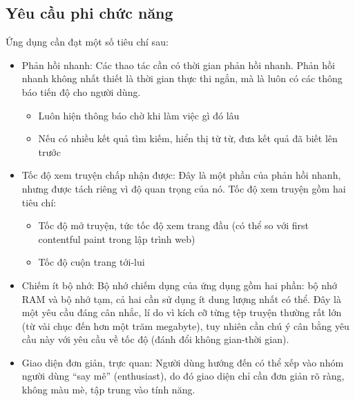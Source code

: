 \documentclass[../../thesis]{subfiles}
\begin{document}
\subsection{Yêu cầu phi chức năng}\label{sec:non-functional-requirements}

Ứng dụng cần đạt một số tiêu chí sau:

\begin{itemize}
    \item
        Phản hồi nhanh: Các thao tác cần có thời gian phản hồi nhanh. Phản hồi
        nhanh không nhất thiết là thời gian thực thi ngắn, mà là luôn có các
        thông báo tiến độ cho người dùng.

        \begin{itemize}
            \item
                Luôn hiện thông báo chờ khi làm việc gì đó lâu
            \item
                Nếu có nhiều kết quả tìm kiếm, hiển thị từ từ, đưa kết quả đã
                biết lên trước
        \end{itemize}
    \item
        Tốc độ xem truyện chấp nhận được: Đây là một phần của phản hồi nhanh,
        nhưng được tách riêng vì độ quan trọng của nó. Tốc độ xem truyện gồm hai
        tiêu chí:

        \begin{itemize}
            \item
                Tốc độ mở truyện, tức tốc độ xem trang đầu (có thể so với first
                contentful paint trong lập trình web)
            \item
                Tốc độ cuộn trang tới-lui
        \end{itemize}
    \item
        Chiếm ít bộ nhớ: Bộ nhớ chiếm dụng của ứng dụng gồm hai phần: bộ nhớ RAM
        và bộ nhớ tạm, cả hai cần sử dụng ít dung lượng nhất có thể. Đây là một
        yêu cầu đáng cân nhắc, lí do vì kích cỡ từng tệp truyện thường rất lớn
        (từ vài chục đến hơn một trăm megabyte), tuy nhiên cần chú ý cân bằng
        yêu cầu này với yêu cầu về tốc độ (đánh đổi không gian-thời gian).
    \item
        Giao diện đơn giản, trực quan: Người dùng hướng đến có thể xếp vào nhóm
        người dùng ``say mê'' (enthusiast), do đó giao diện chỉ cần đơn giản rõ
        ràng, không màu mè, tập trung vào tính năng.
\end{itemize}
\end{document}
